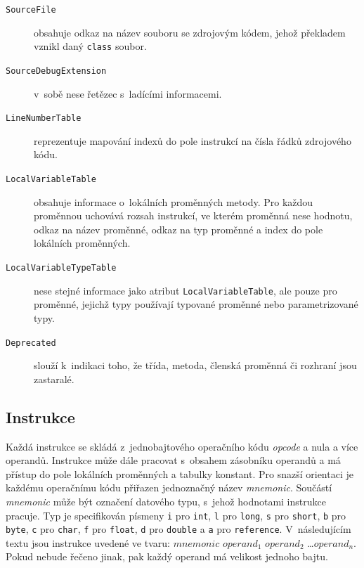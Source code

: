 \begin{description}

\item [\texttt{SourceFile}] obsahuje odkaz na název souboru se zdrojovým kódem, jehož překladem vznikl daný \texttt{class} soubor.

\item [\texttt{SourceDebugExtension}] v~sobě nese řetězec s~ladícími informacemi.

\item [\texttt{LineNumberTable}] reprezentuje mapování indexů do pole instrukcí na čísla řádků zdrojového kódu.

\item [\texttt{LocalVariableTable}] obsahuje informace o~lokálních proměnných metody. Pro každou proměnnou uchovává rozsah instrukcí, ve kterém proměnná nese hodnotu, odkaz na název proměnné, odkaz na typ proměnné a index do pole lokálních proměnných.

\item [\texttt{LocalVariableTypeTable}] nese stejné informace jako atribut \texttt{LocalVariableTable}, ale pouze pro proměnné, jejichž typy používají typované proměnné nebo parametrizované typy. 

\item [\texttt{Deprecated}] slouží k~indikaci toho, že třída, metoda, členská proměnná či rozhraní jsou zastaralé.

\end{description}

\subsection{Instrukce}\label{Bytecode:Format:Instruction}

Každá instrukce se skládá z~jednobajtového operačního kódu \textit{opcode} a nula a více operandů. Instrukce může dále pracovat s~obsahem zásobníku operandů a má přístup do pole lokálních proměnných a tabulky konstant. Pro snazší orientaci je každému operačnímu kódu přiřazen jednoznačný název \textit{mnemonic}. Součástí \textit{mnemonic} může být označení datového typu, s~jehož hodnotami instrukce pracuje. Typ je specifikován písmeny \texttt{i} pro \texttt{int}, \texttt{l} pro \texttt{long}, \texttt{s} pro \texttt{short}, \texttt{b} pro \texttt{byte}, \texttt{c} pro \texttt{char}, \texttt{f} pro \texttt{float}, \texttt{d} pro \texttt{double} a \texttt{a} pro \texttt{reference}. V~následujícím textu jsou instrukce uvedené ve tvaru: $mnemonic$ $operand_1$ $operand_2$ \dots $operand_n$. Pokud nebude řečeno jinak, pak každý operand má velikost jednoho bajtu.

